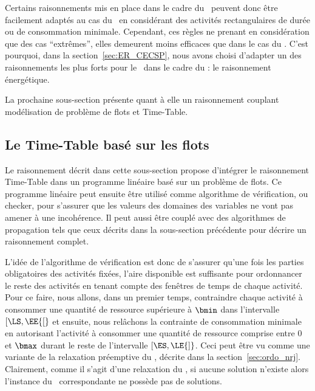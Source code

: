 Certains raisonnements mis en place dans le cadre du \CUSP~peuvent
donc être facilement adaptés au cas du \CECSP~en considérant des
activités rectangulaires de durée ou de consommation
minimale. Cependant, ces règles ne prenant en considération que des
cas ``extrêmes'', elles demeurent moins efficaces que dans le cas du
\CUSP. C'est pourquoi, dans la section~\ref{sec:ER_CECSP}, nous
avons choisi d'adapter un des raisonnements les plus forts pour le
\CUSP~dans le cadre du \CECSP: le raisonnement énergétique.

La prochaine sous-section présente quant à elle un raisonnement couplant
modélisation de problème de flots et Time-Table. 

\subsection{Le Time-Table basé sur les flots}
\label{sec:TTFlot_CECSP}
Le raisonnement décrit dans cette sous-section propose d'intégrer le
raisonnement Time-Table dans un programme linéaire basé sur un
problème de flots. Ce programme linéaire peut ensuite être utilisé
comme algorithme de vérification, ou checker, pour s'assurer que les
valeurs des domaines des variables ne vont pas amener à une
incohérence. Il peut aussi être couplé avec des algorithmes de
propagation tels que ceux décrits dans la sous-section précédente pour
décrire un raisonnement complet.

L'idée de l'algorithme de vérification est donc de s'assurer qu'une
fois les parties obligatoires des activités fixées, l'aire disponible
est suffisante pour ordonnancer le reste des activités en tenant
compte des fenêtres de temps de chaque activité. Pour ce faire, nous
allons, dans un premier temps, contraindre chaque activité à consommer
une quantité de ressource supérieure à $\bmin$ dans l'intervalle
$[\LS,\EE{[}$ et ensuite, nous relâchons la contrainte de consommation
minimale en autorisant l'activité à consommer une quantité de
ressource comprise entre $0$ et $\bmax$ durant le reste de l'intervalle
$[\ES,\LE{]}$. Ceci peut être vu comme une variante de la relaxation
préemptive du \CECSP, décrite dans la section~\ref{sec:ordo_nrj}. 
Clairement, comme il s'agit d'une relaxation du \CECSP, si aucune
solution n'existe alors l'instance du \CECSP~correspondante
ne possède pas de solutions. 

